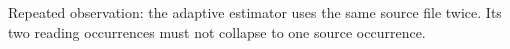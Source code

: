 Repeated observation: the adaptive estimator uses the same source file twice.
Its two reading occurrences must not collapse to one source occurrence.
